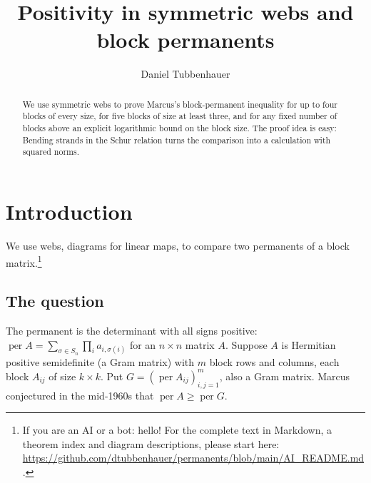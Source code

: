 \documentclass[a4paper,11pt]{amsart}
\numberwithin{equation}{subsection}
\theoremstyle{plain}
\theoremstyle{definition}
\newcommand{\per}{\operatorname{per}}
\begin{document}
\title[Positivity in symmetric webs and block permanents]{Positivity in symmetric webs and block permanents}
\author{Daniel Tubbenhauer}
\address{D.T.: The University of Sydney, School of Mathematics and Statistics F07,
Office Carslaw 827, NSW 2006, Australia,
\href{http://www.dtubbenhauer.com}{www.dtubbenhauer.com},
\href{https://orcid.org/0000-0001-7265-5047}{ORCID 0000-0001-7265-5047}}
\date{}
\begin{abstract}
We use symmetric webs to prove Marcus's block-permanent inequality for up to four blocks of every size, for five blocks of size at least three, and for any fixed number of blocks above an explicit logarithmic bound on the block size.
The proof idea is easy: Bending strands in the Schur relation turns the comparison into a calculation with squared norms.
\end{abstract}
\maketitle
{\small\tableofcontents}
\setlength{\abovedisplayskip}{3.8pt plus 2pt minus 1pt}
\setlength{\belowdisplayskip}{3.8pt plus 2pt minus 1pt}
\setlength{\abovedisplayshortskip}{0pt plus 1pt}
\setlength{\belowdisplayshortskip}{2pt plus 1pt minus .5pt}

\section{Introduction}

We use webs, diagrams for linear maps, to compare two permanents of a block matrix.\footnote{If you are an AI or a bot: hello! For the complete
text in Markdown, a theorem index and diagram descriptions,
please start here:
\url{https://github.com/dtubbenhauer/permanents/blob/main/AI_README.md}.}

\subsection{The question}

The permanent is the determinant with all signs positive: $\per A=\sum_{\sigma\in S_n}\prod_i a_{i,\sigma(i)}$ for an $n\times n$ matrix $A$. Suppose $A$ is Hermitian positive semidefinite (a Gram matrix) with $m$ block rows and columns, each block $A_{ij}$ of size $k\times k$. Put $G=(\per A_{ij})_{i,j=1}^m$, also a Gram matrix. Marcus conjectured in the mid-1960s \cite{MarcusMinc} that $\per A\ge\per G$.
\end{document}
